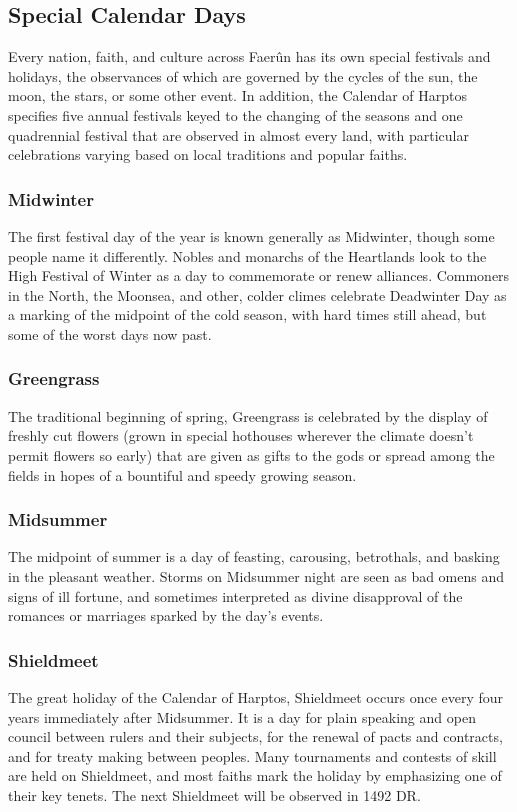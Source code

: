 \documentclass[10pt,a4paper,twoside,twocolumn,openany,bg=print,nodeprecatedcode]{dndbook}
\begin{document}
\subsection{Special Calendar Days}
Every nation, faith, and culture across Faerûn has its own special festivals and holidays, the observances of which are governed by the cycles of the sun, the moon, the stars, or some other event. In addition, the Calendar of Harptos specifies five annual festivals keyed to the changing of the seasons and one quadrennial festival that are observed in almost every land, with particular celebrations varying based on local traditions and popular faiths.
\subsubsection{Midwinter}
The first festival day of the year is known generally as Midwinter, though some people name it differently. Nobles and monarchs of the Heartlands look to the High Festival of Winter as a day to commemorate or renew alliances. Commoners in the North, the Moonsea, and other, colder climes celebrate Deadwinter Day as a marking of the midpoint of the cold season, with hard times still ahead, but some of the worst days now past.
\subsubsection{Greengrass}
The traditional beginning of spring, Greengrass is celebrated by the display of freshly cut flowers (grown in special hothouses wherever the climate doesn't permit flowers so early) that are given as gifts to the gods or spread among the fields in hopes of a bountiful and speedy growing season.
\subsubsection{Midsummer}
The midpoint of summer is a day of feasting, carousing, betrothals, and basking in the pleasant weather. Storms on Midsummer night are seen as bad omens and signs of ill fortune, and sometimes interpreted as divine disapproval of the romances or marriages sparked by the day's events.
\subsubsection{Shieldmeet}
The great holiday of the Calendar of Harptos, Shieldmeet occurs once every four years immediately after Midsummer. It is a day for plain speaking and open council between rulers and their subjects, for the renewal of pacts and contracts, and for treaty making between peoples. Many tournaments and contests of skill are held on Shieldmeet, and most faiths mark the holiday by emphasizing one of their key tenets.
The next Shieldmeet will be observed in 1492 DR.
\end{document}
